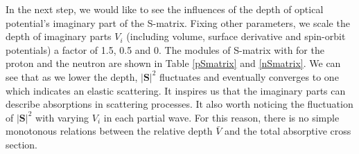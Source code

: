 	In the next step, we would like to see the influences of the depth of optical potential's imaginary part of the S-matrix. Fixing other parameters, we scale the depth of imaginary parts $V_i$ (including volume, surface derivative and spin-orbit potentials) a factor of 1.5, 0.5 and 0. The modules of S-matrix with for the proton and the neutron are shown in Table \ref{pSmatrix} and \ref{nSmatrix}. We can see that as we lower the depth, $|\mathbf{S}|^2$ fluctuates and eventually converges to one which indicates an elastic scattering. It inspires us that the imaginary parts can describe absorptions in scattering processes. It also worth noticing the fluctuation of $|\mathbf{S}|^2$ with varying $V_i$ in each partial wave. For this reason, there is no simple monotonous relations between the relative depth $\bar{V}$ and the total absorptive cross section.

